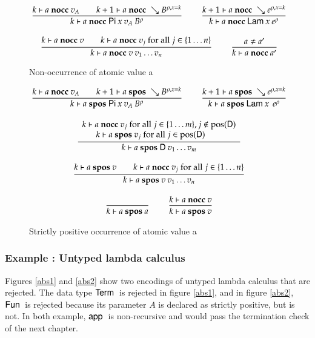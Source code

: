 \newcommand{\nocc}[3]{#1\vdash#2\mbox{ \textbf{nocc} }#3}



\begin{figure}[htp]
\begin{gather*}
\nru{}
{\nocc{k}{a}{v_A} \qquad \nocc{k+1}{a}{\wh \cl{B}{\ins{\rho}{x}{k}}}}
{\nocc{k}{a}{\vpi \: x \: v_A \: \cl{B}{\rho}}  }
\qquad
\nru{}
{\nocc{k+1}{a}{\wh \cl{e}{\ins{\rho}{x}{k}}}}
{\nocc{k}{a}{\vlam \: x \: \cl{e}{\rho}}  }
\\[2ex]
\nru{}
{\nocc{k}{a}{v} \qquad \nocc{k}{a}{v_j} \mbox{ for all } j \in \{1 \ldots n \}}
{\nocc{k}{a}{v \: v_1 \ldots v_n}}
\qquad
\nru{}
{a \neq a'}
{\nocc{k}{a}{a'}}
\end{gather*}
\caption{Non-occurrence of atomic value a}
\label{fnocc}
\end{figure}

\begin{figure}[htp]
\begin{gather*}
\nru{}
{ \nocc{k}{a}{v_A} \qquad \spos{k+1}{a}{\wh \cl{B}{\ins{\rho}{x}{k}}}}
{\spos{k}{a}{\vpi \: x \: v_A \: \cl{B}{\rho}}  }
\qquad
\nru{}
{\spos{k+1}{a}{\wh \cl{e}{\ins{\rho}{x}{k}}}}
{\spos{k}{a}{\vlam \: x \: \: \cl{e}{\rho}}  }
\\[2ex]
\ndru{}
{\nocc{k}{a}{v_j} \mbox{ for all } j \in \{ 1 \ldots m\} , j \notin \pos(\DD)}
{\spos{k}{a}{v_j} \mbox{ for all } j \in \pos(\DD) \qquad}
{\spos{k}{a}{\DD \: v_1 \ldots v_m}}
\\[2ex]
\nru{}
{\spos{k}{a}{v} \qquad \nocc{k}{a}{v_j} \mbox{ for all } j \in \{1 \ldots n \}}
{\spos{k}{a}{v \: v_1 \ldots v_n}}
\\[2ex]
\nru{}
{}
{\spos{k}{a}{a}}
\qquad
\nru{}
{\nocc{k}{a}{v}}
{\spos{k}{a}{v}}
\end{gather*}
\caption{Strictly positive occurrence of atomic value a}
\label{fspos}
\end{figure}


\subsubsection{Example : Untyped lambda calculus}
Figures \ref{abs1} and \ref{abs2} show two encodings of untyped lambda calculus that are rejected. 
The data type $\mathsf{Term}\:$ is rejected in figure \ref{abs1}, and in figure \ref{abs2}, $\mathsf{Fun}\:$ is rejected because its parameter $A$ is declared as strictly positive, but is not.
In both example, $\mathsf{app}\:$ is non-recursive and would pass the termination check of the next chapter.



